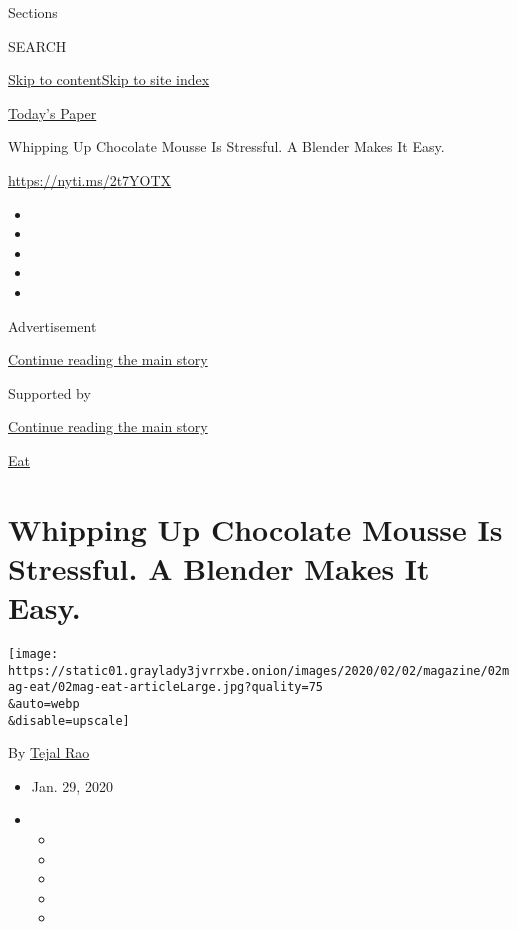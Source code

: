 Sections

SEARCH

\protect\hyperlink{site-content}{Skip to
content}\protect\hyperlink{site-index}{Skip to site index}

\href{https://myaccount.nytimes3xbfgragh.onion/auth/login?response_type=cookie\&client_id=vi}{}

\href{https://www.nytimes3xbfgragh.onion/section/todayspaper}{Today's
Paper}

Whipping Up Chocolate Mousse Is Stressful. A Blender Makes It Easy.

\url{https://nyti.ms/2t7YOTX}

\begin{itemize}
\item
\item
\item
\item
\item
\end{itemize}

Advertisement

\protect\hyperlink{after-top}{Continue reading the main story}

Supported by

\protect\hyperlink{after-sponsor}{Continue reading the main story}

\href{/column/magazine-eat}{Eat}

\hypertarget{whipping-up-chocolate-mousse-is-stressful-a-blender-makes-it-easy}{%
\section{Whipping Up Chocolate Mousse Is Stressful. A Blender Makes It
Easy.}\label{whipping-up-chocolate-mousse-is-stressful-a-blender-makes-it-easy}}

\texttt{[image: https://static01.graylady3jvrrxbe.onion/images/2020/02/02/magazine/02mag-eat/02mag-eat-articleLarge.jpg?quality=75\\\&auto=webp\\\&disable=upscale]}

By \href{https://www.nytimes3xbfgragh.onion/by/tejal-rao}{Tejal Rao}

\begin{itemize}
\item
  Jan. 29, 2020
\item
  \begin{itemize}
  \item
  \item
  \item
  \item
  \item
  \end{itemize}
\end{itemize}

